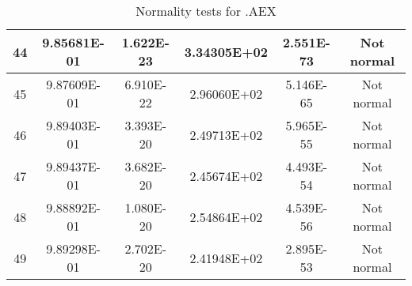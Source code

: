 \begin{table}[h]
\begin{tabular}{|c|c|c|c|c|c|}
		44 & 9.85681E-01 & 1.622E-23 & 3.34305E+02 & 2.551E-73 & Not normal\\\hline
		45 & 9.87609E-01 & 6.910E-22 & 2.96060E+02 & 5.146E-65 & Not normal\\\hline
		46 & 9.89403E-01 & 3.393E-20 & 2.49713E+02 & 5.965E-55 & Not normal\\\hline
		47 & 9.89437E-01 & 3.682E-20 & 2.45674E+02 & 4.493E-54 & Not normal\\\hline
		48 & 9.88892E-01 & 1.080E-20 & 2.54864E+02 & 4.539E-56 & Not normal\\\hline
		49 & 9.89298E-01 & 2.702E-20 & 2.41948E+02 & 2.895E-53 & Not normal\\\hline
	\end{tabular}
	\caption{Normality tests for .AEX}
	\label{tab:normality_tests_AEX}
\end{table}
